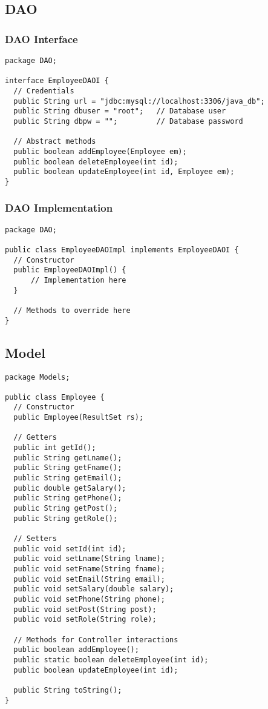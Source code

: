 \documentclass[12pt]{article}
\begin{document}
\pagebreak

\subsection{DAO}
\subsubsection{DAO Interface}
\begin{lstlisting}
package DAO;

interface EmployeeDAOI {
  // Credentials
  public String url = "jdbc:mysql://localhost:3306/java_db";
  public String dbuser = "root";   // Database user
  public String dbpw = "";         // Database password

  // Abstract methods
  public boolean addEmployee(Employee em);
  public boolean deleteEmployee(int id);
  public boolean updateEmployee(int id, Employee em);
}
\end{lstlisting}

\subsubsection{DAO Implementation}
\begin{lstlisting}
package DAO;

public class EmployeeDAOImpl implements EmployeeDAOI {
  // Constructor
  public EmployeeDAOImpl() {
      // Implementation here
  }
  
  // Methods to override here
}
\end{lstlisting}

\pagebreak

\subsection{Model}
\begin{lstlisting}
package Models;

public class Employee {
  // Constructor
  public Employee(ResultSet rs);
  
  // Getters
  public int getId();
  public String getLname();
  public String getFname();
  public String getEmail();
  public double getSalary();
  public String getPhone();
  public String getPost();
  public String getRole();

  // Setters
  public void setId(int id);
  public void setLname(String lname);
  public void setFname(String fname);
  public void setEmail(String email);
  public void setSalary(double salary);
  public void setPhone(String phone);
  public void setPost(String post);
  public void setRole(String role);

  // Methods for Controller interactions
  public boolean addEmployee();
  public static boolean deleteEmployee(int id);
  public boolean updateEmployee(int id);

  public String toString();
}
\end{lstlisting}
\end{document}
